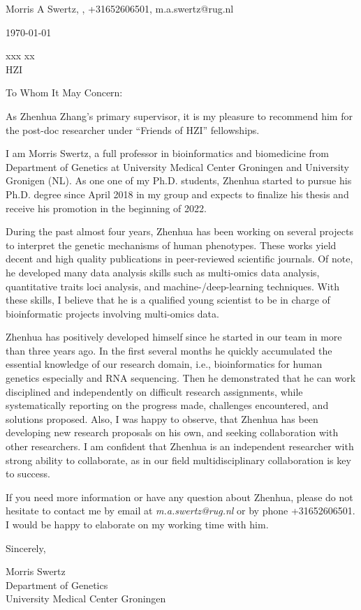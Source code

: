 \documentclass[12pt]{letter}
\begin{document}
Morris A Swertz, , +31652606501, m.a.swertz@rug.nl

\vspace{1cm}

\today

xxx xx \\
HZI

\vspace{1.5cm}

To Whom It May Concern:

As Zhenhua Zhang's primary supervisor, it is my pleasure to recommend him for the post-doc researcher under ``Friends of HZI'' fellowships.

I am Morris Swertz, a full professor in bioinformatics and biomedicine from Department of Genetics at University Medical Center Groningen and University Gronigen (NL).
As one one of my Ph.D. students, Zhenhua started to pursue his Ph.D. degree since April 2018 in my group and expects to finalize his thesis and receive his promotion in the beginning of 2022.

During the past almost four years, Zhenhua has been working on several projects to interpret the genetic mechanisms of human phenotypes.
These works yield decent and high quality publications in peer-reviewed scientific journals.
Of note, he developed many data analysis skills such as multi-omics data analysis, quantitative traits loci analysis, and machine-/deep-learning techniques.
With these skills, I believe that he is a qualified young scientist to be in charge of bioinformatic projects involving multi-omics data.

Zhenhua has positively developed himself since he started in our team in more than three years ago.
In the first several months he quickly accumulated the essential knowledge of our research domain, i.e., bioinformatics for human genetics especially and RNA sequencing.
Then he demonstrated that he can work disciplined and independently on difficult research assignments, while systematically reporting on the progress made, challenges encountered, and solutions proposed.
Also, I was happy to observe, that Zhenhua has been developing new research proposals on his own, and seeking collaboration with other researchers.
I am confident that Zhenhua is an independent researcher with strong ability to collaborate, as in our field multidisciplinary collaboration is key to success.

If you need more information or have any question about Zhenhua, please do not hesitate to contact me by email at \textit{m.a.swertz@rug.nl} or by phone +31652606501.
I would be happy to elaborate on my working time with him.

Sincerely,

Morris Swertz \\
Department of Genetics \\
University Medical Center Groningen
\end{document}
